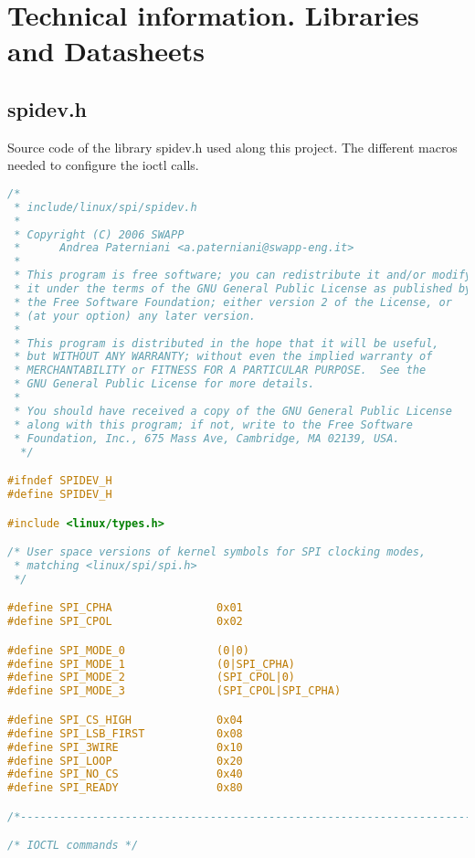 \chapter{Technical information. Libraries and Datasheets}\label{C:Libraries-Datasheets}
\section{spidev.h}\label{C:linux-spi-spidev}
Source code of the library spidev.h used along this project. The different macros needed to configure the ioctl calls.
\begin{lstlisting}[language=C, caption={linux/spi/spidev.h}]
/*
 * include/linux/spi/spidev.h
 *
 * Copyright (C) 2006 SWAPP
 *      Andrea Paterniani <a.paterniani@swapp-eng.it>
 *
 * This program is free software; you can redistribute it and/or modify
 * it under the terms of the GNU General Public License as published by
 * the Free Software Foundation; either version 2 of the License, or
 * (at your option) any later version.
 *
 * This program is distributed in the hope that it will be useful,
 * but WITHOUT ANY WARRANTY; without even the implied warranty of
 * MERCHANTABILITY or FITNESS FOR A PARTICULAR PURPOSE.  See the
 * GNU General Public License for more details.
 *
 * You should have received a copy of the GNU General Public License
 * along with this program; if not, write to the Free Software
 * Foundation, Inc., 675 Mass Ave, Cambridge, MA 02139, USA.
  */

#ifndef SPIDEV_H
#define SPIDEV_H

#include <linux/types.h>

/* User space versions of kernel symbols for SPI clocking modes,
 * matching <linux/spi/spi.h>
 */

#define SPI_CPHA                0x01
#define SPI_CPOL                0x02

#define SPI_MODE_0              (0|0)
#define SPI_MODE_1              (0|SPI_CPHA)
#define SPI_MODE_2              (SPI_CPOL|0)
#define SPI_MODE_3              (SPI_CPOL|SPI_CPHA)

#define SPI_CS_HIGH             0x04
#define SPI_LSB_FIRST           0x08
#define SPI_3WIRE               0x10
#define SPI_LOOP                0x20
#define SPI_NO_CS               0x40
#define SPI_READY               0x80

/*---------------------------------------------------------------------------*/

/* IOCTL commands */


\end{lstlisting}
